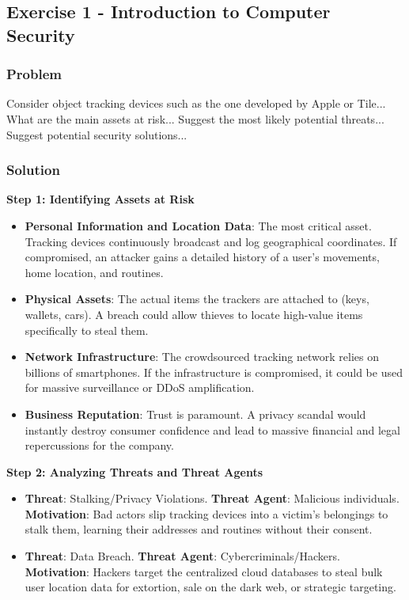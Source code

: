 \documentclass{article}
\begin{document}
\subsection{Exercise 1 - Introduction to Computer Security}
\subsubsection*{Problem}
Consider object tracking devices such as the one developed by Apple or Tile... What are the main assets at risk... Suggest the most likely potential threats... Suggest potential security solutions...

\subsubsection*{Solution}
\textbf{Step 1: Identifying Assets at Risk}
\begin{itemize}
    \item[\textbf{1.}] \textbf{Personal Information and Location Data}: The most critical asset. Tracking devices continuously broadcast and log geographical coordinates. If compromised, an attacker gains a detailed history of a user's movements, home location, and routines.
    \item[\textbf{2.}] \textbf{Physical Assets}: The actual items the trackers are attached to (keys, wallets, cars). A breach could allow thieves to locate high-value items specifically to steal them.
    \item[\textbf{3.}] \textbf{Network Infrastructure}: The crowdsourced tracking network relies on billions of smartphones. If the infrastructure is compromised, it could be used for massive surveillance or DDoS amplification.
    \item[\textbf{4.}] \textbf{Business Reputation}: Trust is paramount. A privacy scandal would instantly destroy consumer confidence and lead to massive financial and legal repercussions for the company.

\end{itemize}
\textbf{Step 2: Analyzing Threats and Threat Agents}
\begin{itemize}
    \item[\textbf{1.}] \textbf{Threat}: Stalking/Privacy Violations. \textbf{Threat Agent}: Malicious individuals. \textbf{Motivation}: Bad actors slip tracking devices into a victim's belongings to stalk them, learning their addresses and routines without their consent.
    \item[\textbf{2.}] \textbf{Threat}: Data Breach. \textbf{Threat Agent}: Cybercriminals/Hackers. \textbf{Motivation}: Hackers target the centralized cloud databases to steal bulk user location data for extortion, sale on the dark web, or strategic targeting.

\end{itemize}
\end{document}
